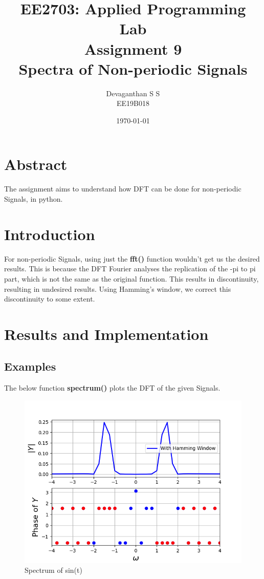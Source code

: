 \documentclass[12pt, a4paper]{report}
\title{\textbf{EE2703: Applied Programming Lab\\Assignment 9\\Spectra of Non-periodic Signals
}}
\author{Devaganthan S S\\ EE19B018}
\date{\today}
\begin{document}
\maketitle


\section{Abstract}
The assignment aims to understand how DFT can be done for non-periodic Signals, in python.

\section{Introduction}
For non-periodic Signals, using just the \textbf{fft()} function wouldn't get us the desired results. This is because the DFT Fourier analyses the replication of the -pi to pi part, which is not the same as the original function. This results in discontinuity, resulting in undesired results. Using Hamming's window, we correct this discontinuity to some extent.
\section{Results and Implementation}
\subsection{Examples }
The below function \textbf{spectrum()} plots the DFT of the given Signals. 
\noindent

\begin{figure}[h!]
    \centering
    \includegraphics[scale=0.7]{fig1.png} 
    \caption{Spectrum of sin(t)}
    \label{fig:my_label}
\end{figure}
\end{document}
